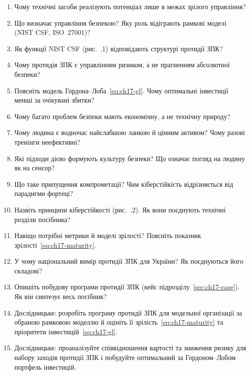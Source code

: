 \selfcheck
\begin{enumerate}
\item Чому технічні засоби реалізують потенціал лише в межах зрілого управління?
\item Що визначає управління безпекою? Яку роль відіграють рамкові моделі (NIST CSF, ISO~27001)?
\item Як функції NIST CSF (рис.~\thechapter.1) відповідають структурі протидії ЗПК?
\item Чому протидія ЗПК є управлінням ризиком, а не прагненням абсолютної безпеки?
\item Поясніть модель Гордона--Лоба~\eqref{eq:ch17-gl}. Чому оптимальні інвестиції менші за очікувані збитки?
\item Чому багато проблем безпеки мають економічну, а не технічну природу?
\item Чому людина є водночас найслабшою ланкою й цінним активом? Чому разові тренінги неефективні?
\item Які підходи дієво формують культуру безпеки? Що означає погляд на людину як на сенсор?
\item Що таке припущення компрометації? Чим кіберстійкість відрізняється від парадигми фортеці?
\item Назвіть принципи кіберстійкості (рис.~\thechapter.2). Як вони поєднують технічні розділи посібника?
\item Навіщо потрібні метрики й моделі зрілості? Поясніть показник зрілості~\eqref{eq:ch17-maturity}.
\item У чому національний вимір протидії ЗПК для України? Як поєднуються його складові?
\item Опишіть побудову програми протидії ЗПК (кейс підрозділу~\ref{sec:ch17-case}). Як він синтезує весь посібник?
\item Дослідницьке: розробіть програму протидії ЗПК для модельної організації за обраною рамковою моделлю й оцініть її зрілість~\eqref{eq:ch17-maturity} та пріоритети інвестицій~\eqref{eq:ch17-gl}.
\item Дослідницьке: проаналізуйте співвідношення вартості та зниження ризику для набору заходів протидії ЗПК і побудуйте оптимальний за Гордоном--Лобом портфель інвестицій.
\end{enumerate}
